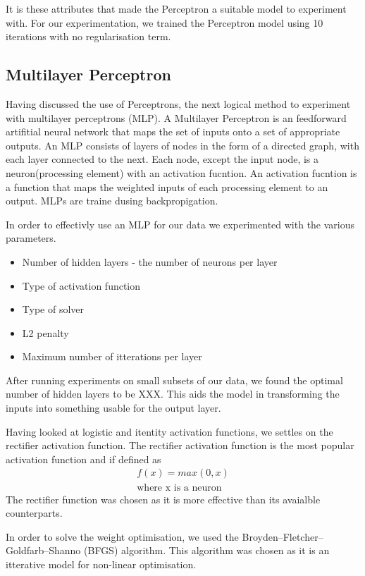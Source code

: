 \documentclass[bsc,frontabs,twoside,singlespacing,parskip,deptreport]{infthesis}     %
\begin{document}
It is these attributes that made the Perceptron a suitable model to experiment with.
For our experimentation, we trained the Perceptron model using  10 iterations with no regularisation term.
\subsection{Multilayer Perceptron}
Having discussed the use of Perceptrons, the next logical method to experiment with multilayer perceptrons (MLP).
A Multilayer Perceptron is an feedforward artifitial neural network that maps the set of inputs
onto a set of appropriate outputs.
An MLP consists of layers of  nodes in the form of a directed graph, with each layer connected to the next.
Each node, except the input node, is a neuron(processing element) with an activation fucntion.
An activation fucntion is a function that maps the weighted inputs of each processing element to an output.
MLPs are traine dusing backpropigation.

In order to effectivly use an MLP for our data we experimented with the various parameters.
\begin{itemize}
  \item Number of hidden layers - the number of neurons per layer
  \item Type of activation function
  \item Type of solver
  \item L2 penalty
  \item Maximum number of itterations per layer
\end{itemize}

After running experiments on  small subsets of our data, we found the optimal number of hidden layers to be XXX. 
This aids the model in transforming the inputs into something usable for the output layer.

Having looked at logistic and itentity activation functions, we settles on the rectifier activation function.
The rectifier activation function is the most popular activation function \cite{lecun2015deep} and if defined as
\begin{eqnarray}
  f(x) = max(0,x)\nonumber\\
  \text{where x is a neuron}\nonumber
\end{eqnarray}
The rectifier function was chosen as it is more effective than its avaialble counterparts\cite{glorot2011deep}.

In order to solve the weight optimisation, we used the Broyden–Fletcher–Goldfarb–Shanno (BFGS) algorithm.
This algorithm was chosen as it is an itterative model for non-linear optimisation.
\end{document}
